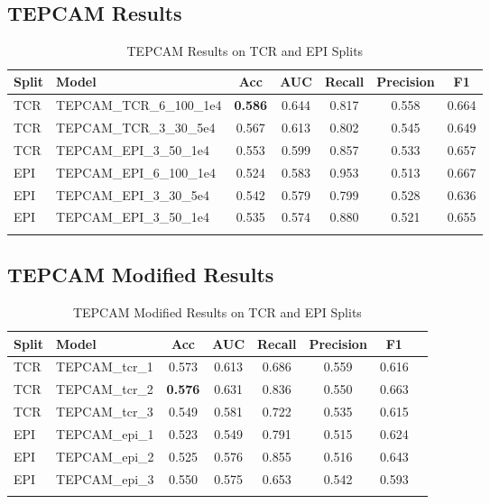 \documentclass[11pt,a4paper]{article}
\begin{document}
$ $\\

\subsection{TEPCAM Results}
\begin{longtable}{|l|l|c|c|c|c|c|}
\hline
\textbf{Split} & \textbf{Model} & \textbf{Acc} & \textbf{AUC} & \textbf{Recall} & \textbf{Precision} & \textbf{F1} \\ \hline
TCR & TEPCAM\_TCR\_6\_100\_1e4 & \textbf{0.586} & 0.644 & 0.817 & 0.558 & 0.664 \\ \hline
TCR & TEPCAM\_TCR\_3\_30\_5e4 & 0.567 & 0.613 & 0.802 & 0.545 & 0.649 \\ \hline
TCR & TEPCAM\_EPI\_3\_50\_1e4 & 0.553 & 0.599 & 0.857 & 0.533 & 0.657 \\ \hline
EPI & TEPCAM\_EPI\_6\_100\_1e4 & 0.524 & 0.583 & 0.953 & 0.513 & 0.667 \\ \hline
EPI & TEPCAM\_EPI\_3\_30\_5e4 & 0.542 & 0.579 & 0.799 & 0.528 & 0.636 \\ \hline
EPI & TEPCAM\_EPI\_3\_50\_1e4 & 0.535 & 0.574 & 0.880 & 0.521 & 0.655 \\ \hline
\caption{TEPCAM Results on TCR and EPI Splits}
\label{table:atm-tcr}
\end{longtable}

\subsection{TEPCAM Modified Results}
\begin{longtable}{|l|l|c|c|c|c|c|c|}
\hline
\textbf{Split} & \textbf{Model} & \textbf{Acc} & \textbf{AUC} & \textbf{Recall} & \textbf{Precision} & \textbf{F1} \\ \hline
TCR & TEPCAM\_tcr\_1 & 0.573 & 0.613 & 0.686 & 0.559 & 0.616 \\ \hline
TCR & TEPCAM\_tcr\_2 & \textbf{0.576} & 0.631 & 0.836 & 0.550 & 0.663 \\ \hline
TCR & TEPCAM\_tcr\_3 & 0.549 & 0.581 & 0.722 & 0.535 & 0.615 \\ \hline
EPI & TEPCAM\_epi\_1 & 0.523 & 0.549 & 0.791 & 0.515 & 0.624 \\ \hline
EPI & TEPCAM\_epi\_2 & 0.525 & 0.576 & 0.855 & 0.516 & 0.643 \\ \hline
EPI & TEPCAM\_epi\_3 & 0.550 & 0.575 & 0.653 & 0.542 & 0.593 \\ \hline
\caption{TEPCAM Modified Results on TCR and EPI Splits}
\label{table:atm-tcr}
\end{longtable}
\end{document}
